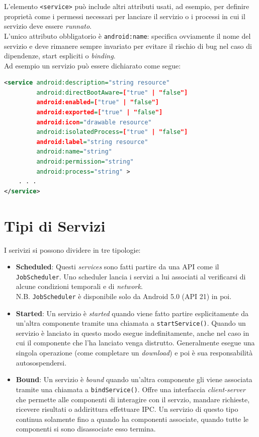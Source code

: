 \documentclass{book}
\begin{document}
L'elemento \texttt{<service>} può include altri attributi usati, ad esempio, per definire proprietà come i permessi necessari per lanciare il servizio o i processi in cui il servizio deve essere \textit{runnato}.\\
L'unico attributo obbligatorio è \texttt{android:name}: specifica ovviamente il nome del servizio e deve rimanere sempre invariato per evitare il rischio di bug nel caso di dipendenze, start espliciti o \textit{binding}.\\
Ad esempio un servizio può essere dichiarato come segue:
\begin{lstlisting}[language=XML]
<service android:description="string resource"
         android:directBootAware=["true" | "false"]
         android:enabled=["true" | "false"]
         android:exported=["true" | "false"]
         android:icon="drawable resource"
         android:isolatedProcess=["true" | "false"]
         android:label="string resource"
         android:name="string"
         android:permission="string"
         android:process="string" >
    . . .
</service>
\end{lstlisting}



\section{Tipi di Servizi}
I serivizi si possono dividere in tre tipologie:
\begin{itemize}
	\item \textbf{Scheduled}: Questi \textit{services} sono fatti partire da una API come il \texttt{JobScheduler}. Uno scheduler lancia i servizi a lui associati al verificarsi di alcune condizioni temporali e di \textit{network}.\\
	N.B. \texttt{JobScheduler} è disponibile solo da Android 5.0 (API 21) in poi.
	\item \textbf{Started}: Un servizio è \textit{started} quando viene fatto partire esplicitamente da un'altra componente tramite una chiamata a \texttt{startService()}. Quando un servizio è lanciato in questo modo esegue indefinitamente, anche nel caso in cui il componente che l'ha lanciato venga distrutto. Generalmente esegue una singola operazione (come completare un \textit{download}) e poi è sua responsabilità autosospendersi. 
	\item \textbf{Bound}: Un servizio è \textit{bound} quando un'altra componente gli viene associata tramite una chiamata a \texttt{bindService()}. Offre una interfaccia \textit{client-server} che permette alle componenti di interagire con il servzio, mandare richieste, ricevere risultati o addirittura effettuare IPC. Un servizio di questo tipo continua solamente fino a quando ha componenti associate, quando tutte le componenti si sono disassociate esso termina.
\end{itemize}
\end{document}

